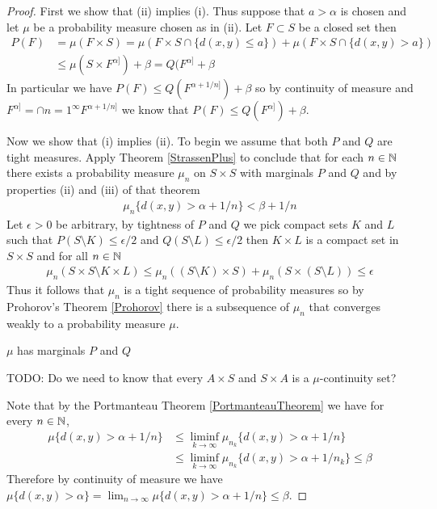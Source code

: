 \begin{proof}
First we show that (ii) implies (i).  Thus suppose that $a > \alpha$ is chosen and let $\mu$ be a probability measure chosen as in (ii).  Let $F \subset S$ be a closed set then
\begin{align*}
P(F) &= \mu(F \times S) = \mu(F \times S \cap \lbrace d(x,y) \leq a \rbrace) + \mu(F \times S \cap \lbrace d(x,y) > a \rbrace) \\
&\leq \mu(S \times F^{\alpha]})+ \beta = Q(F^{\alpha]} + \beta
\end{align*}
In particular we have $P(F) \leq Q(F^{\alpha + 1/n]}) + \beta$ so by continuity of measure and $F^{\alpha]} = \cap{n=1}^\infty F^{\alpha + 1/n]}$ we know that $P(F) \leq Q(F^{\alpha]}) + \beta$.

Now we show that (i) implies (ii).  To begin we assume that both $P$ and $Q$ are tight measures. Apply Theorem \ref{StrassenPlus} to conclude that for each $n \in \mathbb{N}$ there exists a probability measure $\mu_n$ on $S \times S$ with marginals $P$ and $Q$ and by properties (ii) and (iii) of that theorem
\begin{align*}
\mu_n \lbrace d(x,y) > \alpha + 1/n \rbrace < \beta + 1/n
\end{align*}
Let $\epsilon > 0$ be arbitrary, by tightness of $P$ and $Q$ we pick compact sets $K$ and $L$ such that $P(S \setminus K) \leq \epsilon/2$ and $Q(S \setminus L) \leq \epsilon/2$ then $K \times L$ is a compact set in $S \times S$ and for all $n \in \mathbb{N}$
\begin{align*}
\mu_n(S \times S \setminus K \times L) \leq \mu_n((S \setminus K) \times S) + \mu_n(S \times (S \setminus L)) \leq \epsilon
\end{align*}
Thus it follows that $\mu_n$ is a tight sequence of probability measures so by Prohorov's Theorem \ref{Prohorov} there is a subsequence of $\mu_n$ that converges weakly to a probability measure $\mu$.  

\begin{clm}$\mu$ has marginals $P$ and $Q$
\end{clm}
TODO: Do we need to know that every $A \times S$ and $S \times A$ is a $\mu$-continuity set?

Note that by the Portmanteau Theorem \ref{PortmanteauTheorem} we have  for every $n \in \mathbb{N}$,
\begin{align*}
\mu \lbrace d(x,y) > \alpha + 1/n \rbrace &\leq \liminf_{k \to \infty} \mu_{n_k}  \lbrace d(x,y) > \alpha + 1/n \rbrace \\
&\leq \liminf_{k \to \infty} \mu_{n_k}  \lbrace d(x,y) > \alpha + 1/{n_k} \rbrace \leq \beta
\end{align*}
Therefore by continuity of measure we have $\mu \lbrace d(x,y) > \alpha \rbrace = \lim_{n \to \infty} \mu \lbrace d(x,y) > \alpha + 1/n \rbrace \leq \beta$.


\end{proof}
